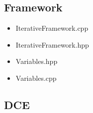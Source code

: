 \subsection{Framework}

\begin{itemize}
   \item IterativeFramework.cpp

   {\tiny }
   
   \item IterativeFramework.hpp
   
   {\tiny }
   
   \item Variables.hpp
   
   {\tiny }
   
   \item Variables.cpp
   
   {\tiny }
   
\end{itemize}

\subsection{DCE}

{\tiny }
